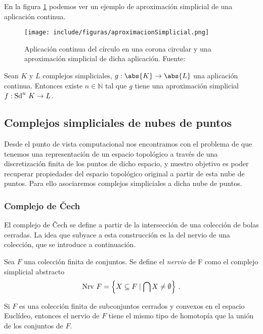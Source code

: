 En la figura \ref{ref:aproxSimp} podemos ver un ejemplo de aproximación simplicial de una aplicación continua.

\begin{figure}[!ht]
\centering
\texttt{[image: include/figuras/aproximacionSimplicial.png]} 
\caption{Aplicación continua del círculo en una corona circular y una aproximación simplicial de dicha aplicación. Fuente: \cite{libroEH}}
\label{ref:aproxSimp}
\end{figure}

\begin{theorem}
\label{ref:teoremaAproximacionSimplicial}
\begin{sloppypar}
Sean $K$ y $L$ complejos simpliciales, ${g: \abs{K} \to \abs{L}}$ una aplicación continua. Entonces existe $n \in \mathbb{N}$ tal que $g$ tiene una aproximación simplicial ${f: \text{\rm Sd}^{n}\ K \to L}$.
\end{sloppypar}
\end{theorem}

\subsection{Complejos simpliciales de nubes de puntos}
Desde el punto de vista computacional nos encontramos con el problema de que tenemos una representación de un espacio topológico a través de una discretización finita de los puntos de dicho espacio, y nuestro objetivo es poder recuperar propiedades del espacio topológico original a partir de esta nube de puntos. Para ello asociaremos complejos simpliciales a dicha nube de puntos.

\subsubsection*{Complejo de \v{C}ech}
El complejo de \v{C}ech se define a partir de la intersección de una colección de bolas cerradas. La idea que subyace a esta construcción es la del nervio de una colección, que se introduce a continuación.

\begin{definition}
Sea $F$ una colección finita de conjuntos. Se define el \emph{nervio} de F como el complejo simplicial abstracto
\[
{\rm Nrv}\ F= \left\{ X \subseteq F \mid \bigcap X \neq \emptyset \right\}\,.
\]
\end{definition}

\begin{lemma}
Si $F$ es una colección finita de subconjuntos cerrados y convexos en el espacio Euclídeo, entonces el nervio de $F$ tiene el mismo tipo de homotopía que la unión de los conjuntos de $F$.
\end{lemma}


